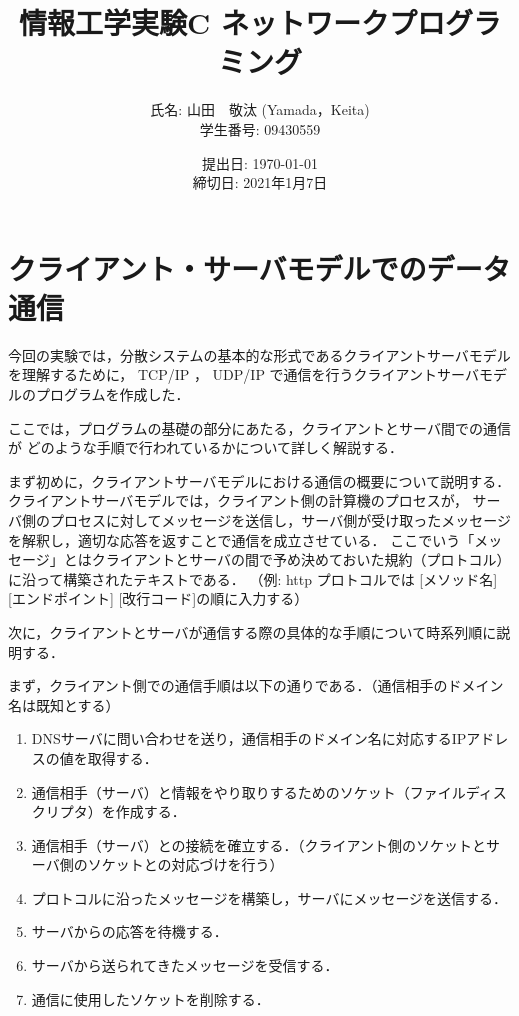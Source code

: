\documentclass[11pt]{jsarticle}
\begin{document}
\title{情報工学実験C ネットワークプログラミング}
\author{
氏名: 山田　敬汰 (Yamada，Keita) \\
学生番号: 09430559
}
\date{提出日: \today \\   
      締切日: 2021年1月7日 \\}  
\maketitle

\section{クライアント・サーバモデルでのデータ通信}

今回の実験では，分散システムの基本的な形式であるクライアントサーバモデルを理解するために，
TCP/IP ， UDP/IP で通信を行うクライアントサーバモデルのプログラムを作成した．

ここでは，プログラムの基礎の部分にあたる，クライアントとサーバ間での通信が
どのような手順で行われているかについて詳しく解説する．

まず初めに，クライアントサーバモデルにおける通信の概要について説明する．クライアントサーバモデルでは，クライアント側の計算機のプロセスが，
サーバ側のプロセスに対してメッセージを送信し，サーバ側が受け取ったメッセージを解釈し，適切な応答を返すことで通信を成立させている．
ここでいう「メッセージ」とはクライアントとサーバの間で予め決めておいた規約（プロトコル）に沿って構築されたテキストである．
（例: http プロトコルでは [メソッド名] [エンドポイント] [改行コード]の順に入力する）

次に，クライアントとサーバが通信する際の具体的な手順について時系列順に説明する．

まず，クライアント側での通信手順は以下の通りである．（通信相手のドメイン名は既知とする）

\begin{enumerate}
      \item DNSサーバに問い合わせを送り，通信相手のドメイン名に対応するIPアドレスの値を取得する．
      \item 通信相手（サーバ）と情報をやり取りするためのソケット（ファイルディスクリプタ）を作成する．
      \item 通信相手（サーバ）との接続を確立する．（クライアント側のソケットとサーバ側のソケットとの対応づけを行う）
      \item プロトコルに沿ったメッセージを構築し，サーバにメッセージを送信する．
      \item サーバからの応答を待機する．
      \item サーバから送られてきたメッセージを受信する．
      \item 通信に使用したソケットを削除する．
\end{enumerate}
\end{document}
